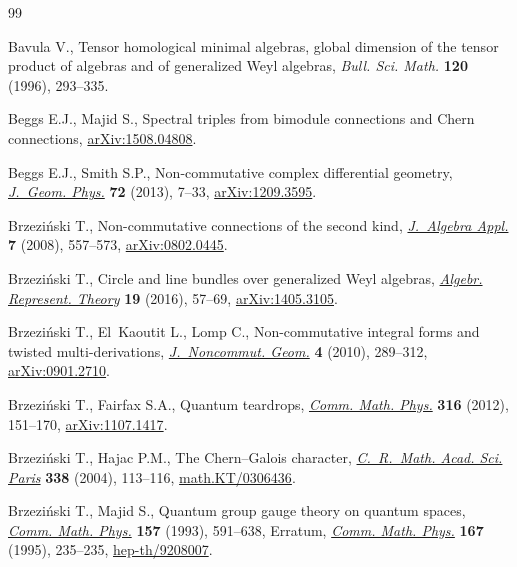 \documentclass[pdftex]{sigma}
\numberwithin{equation}{section}
\begin{document}
\begin{thebibliography}{99}
\footnotesize\itemsep=0pt

Bavula V., Tensor homological minimal algebras, global dimension of the tensor
 product of algebras and of generalized {W}eyl algebras, \textit{Bull. Sci.
 Math.} \textbf{120} (1996), 293--335.

Beggs E.J., Majid S., Spectral triples from bimodule connections and {C}hern
 connections, \href{http://arxiv.org/abs/1508.04808}{arXiv:1508.04808}.

Beggs E.J., Smith S.P., Non-commutative complex dif\/ferential geometry,
 \href{http://dx.doi.org/10.1016/j.geomphys.2013.03.018}{\textit{J.~Geom. Phys.}} \textbf{72} (2013), 7--33, \href{http://arxiv.org/abs/1209.3595}{arXiv:1209.3595}.

Brzezi{\'n}ski T., Non-commutative connections of the second kind,
 \href{http://dx.doi.org/10.1142/S0219498808002977}{\textit{J.~Algebra Appl.}} \textbf{7} (2008), 557--573, \href{http://arxiv.org/abs/0802.0445}{arXiv:0802.0445}.

Brzezi{\'n}ski T., Circle and line bundles over generalized {W}eyl algebras,
 \href{http://dx.doi.org/10.1007/s10468-015-9562-7}{\textit{Algebr. Represent. Theory}} \textbf{19} (2016), 57--69,
 \href{http://arxiv.org/abs/1405.3105}{arXiv:1405.3105}.

Brzezi{\'n}ski T., El~Kaoutit L., Lomp C., Non-commutative integral forms and
 twisted multi-derivations, \href{http://dx.doi.org/10.4171/JNCG/56}{\textit{J.~Noncommut. Geom.}} \textbf{4} (2010),
 289--312, \href{http://arxiv.org/abs/0901.2710}{arXiv:0901.2710}.

Brzezi{\'n}ski T., Fairfax S.A., Quantum teardrops, \href{http://dx.doi.org/10.1007/s00220-012-1580-2}{\textit{Comm. Math. Phys.}}
 \textbf{316} (2012), 151--170, \href{http://arxiv.org/abs/1107.1417}{arXiv:1107.1417}.

Brzezi{\'n}ski T., Hajac P.M., The {C}hern--{G}alois character,
 \href{http://dx.doi.org/10.1016/j.crma.2003.11.009}{\textit{C.~R.~Math. Acad. Sci. Paris}} \textbf{338} (2004), 113--116,
 \href{http://arxiv.org/abs/math.KT/0306436}{math.KT/0306436}.

Brzezi{\'n}ski T., Majid S., Quantum group gauge theory on quantum spaces,
 \href{http://dx.doi.org/10.1007/BF02096884}{\textit{Comm. Math. Phys.}} \textbf{157} (1993), 591--638, {E}rratum,
 \href{http://dx.doi.org/10.1007/BF02099359}{\textit{Comm. Math. Phys.}}
 \textbf{167} (1995), 235--235, \href{http://arxiv.org/abs/hep-th/9208007}{hep-th/9208007}.


\end{thebibliography}
\end{document}
